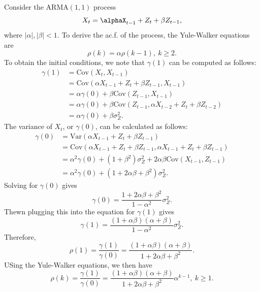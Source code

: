 \begin{example}[]

Consider the $\mathrm{ARMA}(1, 1)$ process
\[ X_t = \alphaX_{t-1} + Z_t + \beta Z_{t-1},  \]
where $|\alpha|, |\beta| < 1$. To derive the ac.f. of the process, the Yule-Walker equations are 
\[ \rho(k) = \alpha \rho(k-1), \ k \geq 2. \]
To obtain the initial conditions, we note that $\gamma(1)$ can be computed as follows:
\begin{align*}
	\gamma(1) 
	&= \mathrm{Cov}(X_t, X_{t-1}) \\
	&= \mathrm{Cov}(\alpha X_{t-1} + Z_t + \beta Z_{t-1}, X_{t-1}) \\
	&= \alpha \gamma(0) + \beta \mathrm{Cov}(Z_{t-1}, X_{t-1}) \\
	&= \alpha \gamma(0) + \beta \mathrm{Cov}(Z_{t-1}, \alpha X_{t-2} + Z_t + \beta Z_{t-2}) \\
	&= \alpha \gamma(0) + \beta \sigma_Z^2.
\end{align*}
The variance of $X_t$, or $\gamma(0)$, can be calculated as follows:
\begin{align*}
	\gamma(0) 
	&= \mathrm{Var}(\alpha X_{t-1} + Z_t + \beta Z_{t-1}) \\
	&= \mathrm{Cov}(\alpha X_{t-1} + Z_t + \beta Z_{t-1}, \alpha X_{t-1} + Z_t + \beta Z_{t-1}) \\
	&= \alpha^2 \gamma(0) + (1 + \beta^2)\sigma_Z^2 + 2 \alpha \beta \mathrm{Cov}(X_{t-1}, Z_{t-1}) \\
	&= \alpha^2 \gamma(0) + (1 + 2 \alpha \beta + \beta^2)\sigma_Z^2.
\end{align*}
Solving for $\gamma(0)$ gives 
\[ \gamma(0) = \frac{1 + 2 \alpha \beta + \beta^2}{1 - \alpha^2} \sigma_Z^2. \]
Thewn plugging this into the equation for $\gamma(1)$ gives 
\[ \gamma(1) = \frac{(1 + \alpha \beta)(\alpha + \beta)}{1 - \alpha^2}\sigma_Z^2. \]
Therefore, 
\[ \rho(1) = \frac{\gamma(1)}{\gamma(0)} = \frac{(1 + \alpha \beta)(\alpha + \beta)}
{1 + 2 \alpha \beta + \beta^2}. \]
USing the Yule-Walker equations, we then have 
\[ \rho(k) = \frac{\gamma(1)}{\gamma(0)} = \frac{(1 + \alpha \beta)(\alpha + \beta)}
{1 + 2 \alpha \beta + \beta^2} \alpha^{k - 1}, \ k \geq 1. \]
\end{example}

